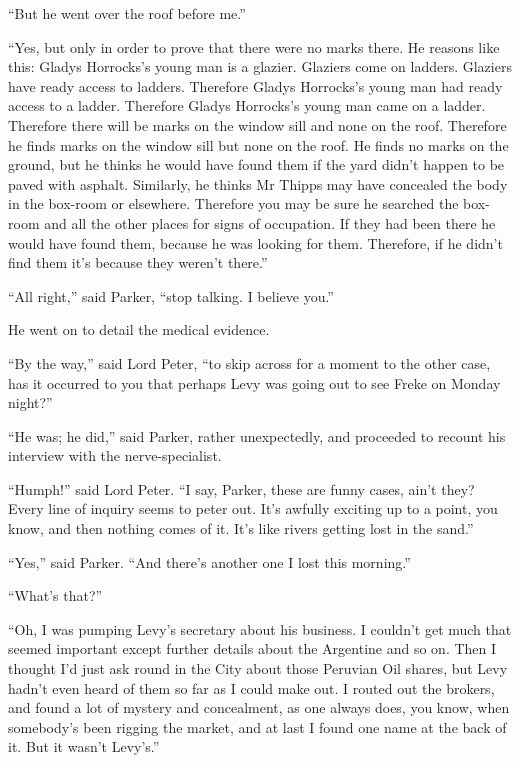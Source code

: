 \enquote{But he went over the roof before me.}

\enquote{Yes, but only in order to prove that there were no marks there. He reasons like this: Gladys Horrocks’s young man is a glazier. Glaziers come on ladders. Glaziers have ready access to ladders. Therefore Gladys Horrocks’s young man had ready access to a ladder. Therefore Gladys Horrocks’s young man came on a ladder. Therefore there will be marks on the window sill and none on the roof. Therefore he finds marks on the window sill but none on the roof. He finds no marks on the ground, but he thinks he would have found them if the yard didn’t happen to be paved with asphalt. Similarly, he thinks Mr Thipps may have concealed the body in the box-room or elsewhere. Therefore you may be sure he searched the box-room and all the other places for signs of occupation. If they had been there he would have found them, because he was looking for them. Therefore, if he didn’t find them it’s because they weren’t there.}

\enquote{All right,} said Parker, \enquote{stop talking. I believe you.}

He went on to detail the medical evidence.

\enquote{By the way,} said Lord Peter, \enquote{to skip across for a moment to the other case, has it occurred to you that perhaps Levy was going out to see Freke on Monday night?}

\enquote{He was; he did,} said Parker, rather unexpectedly, and proceeded to recount his interview with the nerve-specialist.

\enquote{Humph!} said Lord Peter. \enquote{I say, Parker, these are funny cases, ain’t they? Every line of inquiry seems to peter out. It’s awfully exciting up to a point, you know, and then nothing comes of it. It’s like rivers getting lost in the sand.}

\enquote{Yes,} said Parker. \enquote{And there’s another one I lost this morning.}

\enquote{What’s that?}

\enquote{Oh, I was pumping Levy’s secretary about his business. I couldn’t get much that seemed important except further details about the Argentine and so on. Then I thought I’d just ask round in the City about those Peruvian Oil shares, but Levy hadn’t even heard of them so far as I could make out. I routed out the brokers, and found a lot of mystery and concealment, as one always does, you know, when somebody’s been rigging the market, and at last I found one name at the back of it. But it wasn’t Levy’s.}

